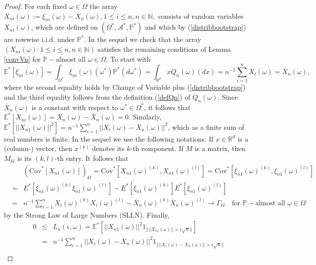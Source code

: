 \documentclass[10pt,a4paper]{amsart}
\begin{document}
\begin{proof} For each fixed $\omega \in \Omega$ the array $X_{ni}(\omega):=\xi_{ni}(\omega)- \overline{X}_n(\omega), 1 \le i \le n, n \in \mathbb{N},$ consists of random variables $X_{ni}(\omega)$, which are defined on $(\Omega^*,\mathcal{A}^*,\mathbb{P}^*)$ and which by (\ref{distribbootstrap}) are rowwise i.i.d. under $\mathbb{P}^*$. In the sequel we check that the array $(X_{ni}(\omega): 1 \le i \le n, n \in \mathbb{N})$ satisfies the remaining conditions of Lemma \ref{convVn} for $\mathbb{P}-$almost all $\omega \in \Omega.$ To start with
$$
   \mathbb{E}^*[\xi_{ni}(\omega)]=\int_{\Omega^*} \xi_{ni}(\omega)(\omega^*) \mathbb{P}^*(d\omega^*)= \int_{\mathbb{R}^p} x  Q_n(\omega)(dx)=n^{-1} \sum_{i=1}^n X_i(\omega) = \overline{X}_n(\omega),
$$
where the second equality holds by Change of Variable plus (\ref{distribbootstrap}) and the third equality follows from the definition (\ref{defQn}) of $Q_n(\omega)$. Since $\overline{X}_n(\omega)$ is a constant with respect to $\omega^* \in \Omega^*$, it follows that
$\mathbb{E}^*[X_{ni}(\omega)]=\overline{X}_n(\omega)-\overline{X}_n(\omega)=0.$ Similarly, $\mathbb{E}^*[||X_{n1}(\omega)||^2]=n^{-1} \sum_{i=1}^n ||X_i(\omega)-\overline{X}_n(\omega)||^2$, which as a finite sum of real numbers is finite. In the sequel we use the following notations:
If $x \in \mathbb{R}^d$ is a (column-) vector, then $x^{(k)}$ denotes its $k$-th component. If $M$ is a matrix, then $M_{kl}$ is its $(k,l)$-th entry. It follows that
\begin{eqnarray*}
& &(\text{Cov}^*[X_{n1}(\omega)])_{kl}= \text{Cov}^*[X_{n1}(\omega)^{(k)},X_{n1}(\omega)^{(l)}]=\text{Cov}^*[\xi_{n1}(\omega)^{(k)},\xi_{n1}(\omega)^{(l)}]\\
&=& E^*[\xi_{n1}(\omega)^{(k)} \xi_{n1}(\omega)^{(l)}]- E^*[\xi_{n1}(\omega)^{(k)}] E^*[\xi_{n1}(\omega)^{(l)}]\\
&=& n^{-1} \sum_{i=1}^n X_i(\omega)^{(k)}X_i(\omega)^{(l)}-\overline{X}_n(\omega)^{(k)}\overline{X}_n(\omega)^{(l)}
\rightarrow \Gamma_{kl} \quad \text{for } \mathbb{P}-\text{almost all } \omega \in \Omega
\end{eqnarray*}
by the Strong Law of Large Numbers (SLLN). Finally,
\begin{eqnarray} \label{Lindeberg}
0 &\le& L_n(\epsilon,\omega)= \mathbb{E}^*[||X_{n1}(\omega)||^2 1_{\{||X_{n1}(\omega)||> \epsilon \sqrt{n}\}}] \nonumber\\
&=& n^{-1}\sum_{i=1}^n ||X_i(\omega)-\overline{X}_n(\omega)||^2 1_{\{||X_i(\omega)-\overline{X}_n(\omega)||> \epsilon \sqrt{n}\}} \label{LB}\\

\end{eqnarray}
\end{proof}
\end{document}
